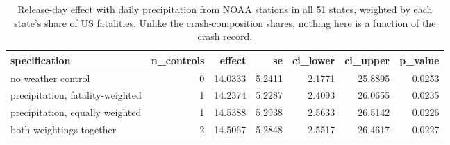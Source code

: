 \begin{table}
\caption{Release-day effect with daily precipitation from NOAA stations in all 51 states, weighted by each state's share of US fatalities. Unlike the crash-composition shares, nothing here is a function of the crash record.}
\begin{tabular}{lrrrrrr}
\toprule
specification & n\_controls & effect & se & ci\_lower & ci\_upper & p\_value \\
\midrule
no weather control & 0 & 14.0333 & 5.2411 & 2.1771 & 25.8895 & 0.0253 \\
precipitation, fatality-weighted & 1 & 14.2374 & 5.2287 & 2.4093 & 26.0655 & 0.0235 \\
precipitation, equally weighted & 1 & 14.5388 & 5.2938 & 2.5633 & 26.5142 & 0.0226 \\
both weightings together & 2 & 14.5067 & 5.2848 & 2.5517 & 26.4617 & 0.0227 \\
\bottomrule
\end{tabular}
\end{table}
